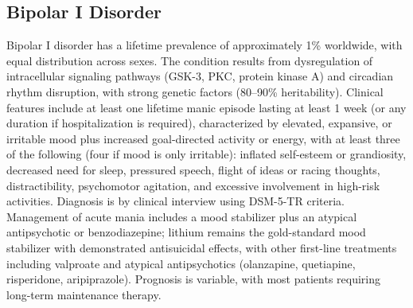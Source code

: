 



\label{sec:Mood Disorders}

\subsection{Bipolar I Disorder}
\label{sec:Bipolar I Disorder}
Bipolar I disorder has a lifetime prevalence of approximately 1\% worldwide, with equal distribution across sexes. The condition results from dysregulation of intracellular signaling pathways (GSK-3, PKC, protein kinase A) and circadian rhythm disruption, with strong genetic factors (80--90\% heritability). Clinical features include at least one lifetime manic episode lasting at least 1 week (or any duration if hospitalization is required), characterized by elevated, expansive, or irritable mood plus increased goal-directed activity or energy, with at least three of the following (four if mood is only irritable): inflated self-esteem or grandiosity, decreased need for sleep, pressured speech, flight of ideas or racing thoughts, distractibility, psychomotor agitation, and excessive involvement in high-risk activities. Diagnosis is by clinical interview using DSM-5-TR criteria. Management of acute mania includes a mood stabilizer plus an atypical antipsychotic or benzodiazepine; lithium remains the gold-standard mood stabilizer with demonstrated antisuicidal effects, with other first-line treatments including valproate and atypical antipsychotics (olanzapine, quetiapine, risperidone, aripiprazole). Prognosis is variable, with most patients requiring long-term maintenance therapy.

